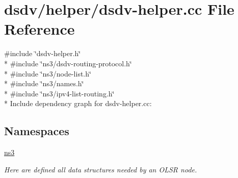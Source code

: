 \hypertarget{dsdv-helper_8cc}{}\section{dsdv/helper/dsdv-\/helper.cc File Reference}
\label{dsdv-helper_8cc}
{\ttfamily \#include \char`\"{}dsdv-\/helper.\+h\char`\"{}}\\*
{\ttfamily \#include \char`\"{}ns3/dsdv-\/routing-\/protocol.\+h\char`\"{}}\\*
{\ttfamily \#include \char`\"{}ns3/node-\/list.\+h\char`\"{}}\\*
{\ttfamily \#include \char`\"{}ns3/names.\+h\char`\"{}}\\*
{\ttfamily \#include \char`\"{}ns3/ipv4-\/list-\/routing.\+h\char`\"{}}\\*
Include dependency graph for dsdv-\/helper.cc\+:
\subsection*{Namespaces}
\begin{DoxyCompactItemize}
\item 
 \hyperlink{namespacens3}{ns3}
\begin{DoxyCompactList}\small\item\em Here are defined all data structures needed by an O\+L\+SR node. \end{DoxyCompactList}\end{DoxyCompactItemize}
